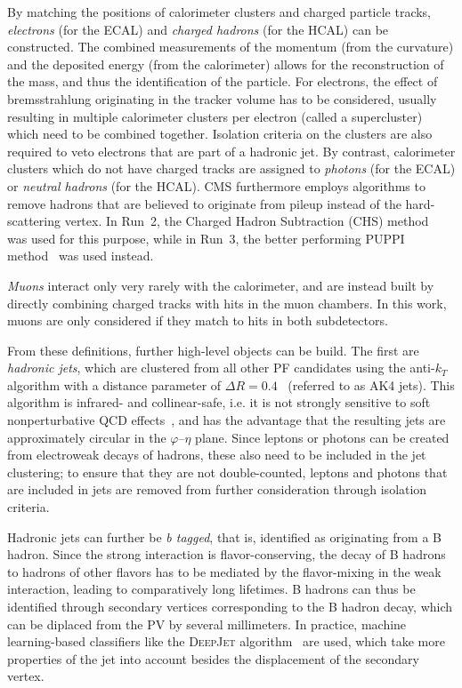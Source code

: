 By matching the positions of calorimeter clusters and charged particle tracks, \textit{electrons} (for the ECAL) and \textit{charged hadrons} (for the HCAL) can be constructed. The combined measurements of the momentum (from the curvature) and the deposited energy (from the calorimeter) allows for the reconstruction of the mass, and thus the identification of the particle.
For electrons, the effect of bremsstrahlung originating in the tracker volume has to be considered, usually resulting in multiple calorimeter clusters per electron (called a supercluster) which need to be combined together. Isolation criteria on the clusters are also required to veto electrons that are part of a hadronic jet. 
By contrast, calorimeter clusters which do not have charged tracks are assigned to \textit{photons} (for the ECAL) or \textit{neutral hadrons} (for the HCAL). 
CMS furthermore employs algorithms to remove hadrons that are believed to originate from pileup instead of the hard-scattering vertex. In Run~2, the Charged Hadron Subtraction (CHS) method~\cite{CMS:PRF-14-001} was used for this purpose, while in Run~3, the better performing PUPPI method~\cite{Bertolini:2014bba,CMS:2020ebo} was used instead.

\textit{Muons} interact only very rarely with the calorimeter, and are instead built by directly combining charged tracks with hits in the muon chambers. In this work, muons are only considered if they match to hits in both subdetectors.

From these definitions, further high-level objects can be build. The first are \textit{hadronic jets}, which are clustered from all other PF candidates using the anti-$k_T$ algorithm with a distance parameter of $\Delta R = 0.4$~\cite{Cacciari:2008gp} (referred to as AK4 jets). This algorithm is infrared- and collinear-safe, i.e. it is not strongly sensitive to soft nonperturbative QCD effects~\cite{Skands:2012ts}, and has the advantage that the resulting jets are approximately circular in the $\varphi$--$\eta$ plane. Since leptons or photons can be created from electroweak decays of hadrons, these also need to be included in the jet clustering; to ensure that they are not double-counted, leptons and photons that are included in jets are removed from further consideration through isolation criteria.

Hadronic jets can further be \textit{b tagged}, that is, identified as originating from a B hadron. Since the strong interaction is flavor-conserving, the decay of B hadrons to hadrons of other flavors has to be mediated by the flavor-mixing in the weak interaction, leading to comparatively long lifetimes. B hadrons can thus be identified through secondary vertices corresponding to the B hadron decay, which can be diplaced from the PV by several millimeters. In practice, machine learning-based classifiers like the \textsc{DeepJet} algorithm~\cite{DeepJet:2020} are used, which take more properties of the jet into account besides the displacement of the secondary vertex.

